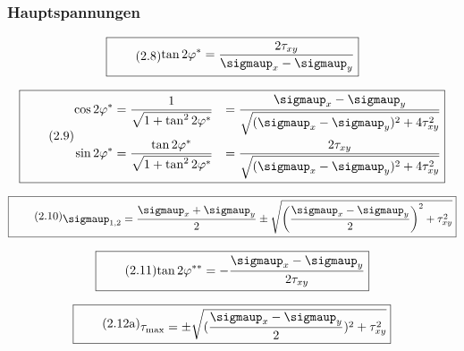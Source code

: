 \documentclass[11pt]{article}
\newcommand{\1}{ {\mathds{1}} }
\renewcommand{\sigma  }{\sigmaup   }
\begin{document}
		\subsubsection{Hauptspannungen}
		
		\begin{equation}
			\boxed{
				\tag{2.8}
				\begin{split}
					\tan 2\varphi^\ast
					=
					\frac{2 \tau_{xy}}{\sigma_x - \sigma_y}
				\end{split}
			}
		\end{equation}

		\begin{equation}
			\boxed{
				\tag{2.9}
				\begin{split}
					\cos 2\varphi^\ast
					&=
					\frac{1}{\sqrt{1+ \tan^2 2\varphi^\ast}}
					&=
					\frac{\sigma_x - \sigma_y}{\sqrt{(\sigma_x - \sigma_y)^2 + 4 \tau_{xy}^2}} \\
					\sin 2\varphi^\ast
					&=
					\frac{\tan 2\varphi^\ast}{\sqrt{1+ \tan^2 2\varphi^\ast}}
					&=
					\frac{2\tau_{xy}}{\sqrt{(\sigma_x - \sigma_y)^2 + 4 \tau_{xy}^2}} \\					
				\end{split}
			}
		\end{equation}

		\begin{equation}
			\boxed{
				\tag{2.10}
				\begin{split}
					\sigma_{1,2}
					=
					\frac{\sigma_x + \sigma_y}{2}
					\pm
					\sqrt{\left(
						\frac{\sigma_x - \sigma_y}{2}
						\right)^2
						+
						\tau_{xy}^2
					}
				\end{split}
			}
		\end{equation}

		\begin{equation}
			\boxed{
				\tag{2.11}
				\begin{split}
					\tan 2\varphi^{\ast\ast}
					=
					-\frac{\sigma_x - \sigma_y}{2 \tau_{xy}}
				\end{split}
			}
		\end{equation}

		\begin{equation}
			\boxed{
				\tag{2.12a}
				\begin{split}
					\tau_{\text{max}}
					=
					\pm
					\sqrt{(\frac{\sigma_x - \sigma_y}{2})^2 + \tau_{xy}^2}
				\end{split}
			}
		\end{equation}
\end{document}
